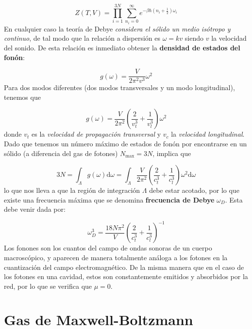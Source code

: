 \documentclass[12pt,a4paper]{article}
\numberwithin{equation}{section}
\numberwithin{figure}{section}
\newcommand{\parentesis}[1]{\left( #1  \right)}
\newcommand{\D}{\mathrm{d}}
\theoremstyle{definition}
\begin{document}
\begin{equation}
Z(T,V) = \prod_{i=1}^{3N} \sum_{n_i=0}^{\infty} e^{-\beta \hbar \parentesis{n_i + \frac{1}{2}}\omega_i}
\end{equation}
En cualquier caso la teoría de Debye \textit{considera el sólido un medio isótropo y continuo}, de tal modo que la relación a dispersión es $\omega  = k v$ siendo $v$ la velocidad del sonido. De esta relación es inmediato obtener la \textbf{densidad de estados del fonón}:

\begin{equation}
g(\omega) = \frac{V}{2\pi^2 v^3} \omega^2
\end{equation}
Para dos modos diferentes (dos modos transversales y un modo longitudinal), tenemos que

\begin{equation}
g(\omega) = \frac{V}{2\pi^2} \parentesis{\frac{2}{v_t^3} + \frac{1}{v_l^3}}\omega^2
\end{equation}
donde $v_t$ es la \textit{velocidad de propagación transversal} y $v_c$ la \textit{velocidad longitudinal}. Dado que tenemos un número máximo de estados de fonón por encontrarse en un sólido (a diferencia del gas de fotones) $N_{\max} = 3N$, implica que

\begin{equation}
3N = \int_{\Lambda} g(\omega) \D \omega  = \int_{\Lambda} \frac{V}{2\pi^2} \parentesis{\frac{2}{c_t^3} + \frac{1}{c_l^3}} \omega^2 \D \omega
\end{equation}
lo que nos lleva a que la región de integración $\Lambda$ debe estar acotado, por lo que existe una frecuencia máxima que se denomina \textbf{frecuencia de Debye} $\omega_D$. Esta debe venir dada por:

\begin{equation}
\omega_D^3 = \frac{18 N \pi^2}{V} \parentesis{\frac{2}{c_t^3}+\frac{1}{c_l^3}}^{-1}
\end{equation}
Los fonones son los cuantos del campo de ondas sonoras de un cuerpo macroscópico, y aparecen de manera totalmente análoga a los fotones en la cuantización del campo electromagnético. De la misma manera que en el caso de los fotones en una cavidad, estos son constantemente emitidos y absorbidos por la red, por lo que se verifica que $\mu=0$. 


\newpage

\section{Gas de Maxwell-Boltzmann}
\end{document}
